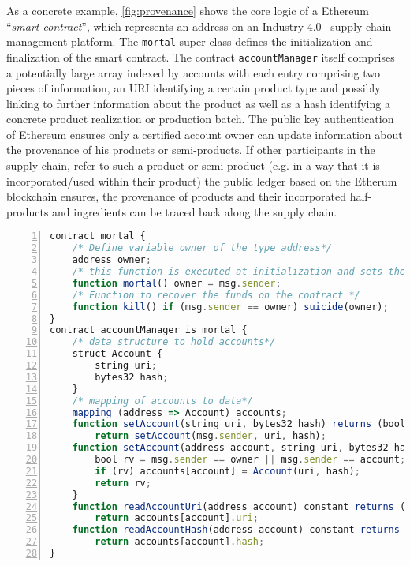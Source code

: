 As a concrete example, \autoref{fig:provenance} shows the core logic of a Ethereum ``\textit{smart contract}'', which represents an address on an Industry 4.0~\cite{christopherbrewster2014} supply chain management platform.
The \texttt{mortal} super-class defines the initialization and finalization of the smart contract.
The contract \texttt{accountManager} itself comprises a potentially large array indexed by accounts with each entry comprising two pieces of information, an URI identifying a certain product type and possibly linking to further information about the product as well as a hash identifying a concrete product realization or production batch.
The public key authentication of Ethereum ensures only a certified account owner can update information about the provenance of his products or semi-products.
If other participants in the supply chain, refer to such a product or semi-product (e.g. in a way that it is incorporated/used within their product) the public ledger based on the Etherum blockchain ensures, the provenance of products and their incorporated half-products and ingredients can be traced back along the supply chain.

\begin{lstlisting}[label=fig:provenance,caption=Simple Ethereum Contract on Industry 4.0 Platform \texttt{Provenance.org}~\cite{juttasteinerjessibakergavinwood2013},language=Javascript,basicstyle=\scriptsize \ttfamily,numbers=left,numberstyle=\tiny\color{mygray}]
contract mortal {
    /* Define variable owner of the type address*/
    address owner;
    /* this function is executed at initialization and sets the owner of the contract */
    function mortal() owner = msg.sender;
    /* Function to recover the funds on the contract */
    function kill() if (msg.sender == owner) suicide(owner);
}
contract accountManager is mortal {
    /* data structure to hold accounts*/
    struct Account {
        string uri;
        bytes32 hash;
    }
    /* mapping of accounts to data*/
    mapping (address => Account) accounts;
    function setAccount(string uri, bytes32 hash) returns (bool)
        return setAccount(msg.sender, uri, hash);
    function setAccount(address account, string uri, bytes32 hash) returns (bool) {
        bool rv = msg.sender == owner || msg.sender == account;
        if (rv) accounts[account] = Account(uri, hash);
        return rv;
    }
    function readAccountUri(address account) constant returns (string)
        return accounts[account].uri;
    function readAccountHash(address account) constant returns (bytes32)
        return accounts[account].hash;
}
\end{lstlisting}


